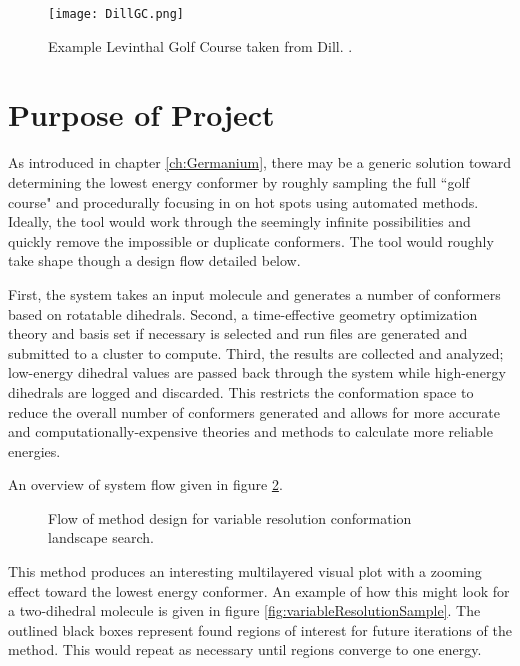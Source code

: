 \begin{figure}
	
	\centering
	
	\texttt{[image: DillGC.png]}
	
	\caption{Example Levinthal Golf Course taken from Dill. \cite{DillLevGC}.}
	
	\label{fig:DillGC}
	
\end{figure}


\section{Purpose of Project}

As introduced in chapter \ref{ch:Germanium}, there may be a generic solution toward determining the lowest energy conformer by roughly sampling the full ``golf course" and procedurally focusing in on hot spots using automated methods.
Ideally, the tool would work through the seemingly infinite possibilities and quickly remove the impossible or duplicate conformers.
The tool would roughly take shape though a design flow detailed below.

First, the system takes an input molecule and generates a number of conformers based on rotatable dihedrals.
Second, a time-effective geometry optimization theory and basis set if necessary is selected and run files are generated and submitted to a cluster to compute.
Third, the results are collected and analyzed; low-energy dihedral values are passed back through the system while high-energy dihedrals are logged and discarded.
This restricts the conformation space to reduce the overall number of conformers generated and allows for more accurate and computationally-expensive theories and methods to calculate more reliable energies.

An overview of system flow given in figure \ref{fig:VRSDesign}.
\begin{figure}
	\centering 
	\caption{Flow of method design for variable resolution conformation landscape search.}
	\label{fig:VRSDesign}
	
\end{figure}
This method produces an interesting multilayered visual plot with a zooming effect toward the lowest energy conformer.
An example of how this might look for a two-dihedral molecule is given in figure \ref{fig:variableResolutionSample}.
The outlined black boxes represent found regions of interest for future iterations of the method. 
This would repeat as necessary until regions converge to one energy.

